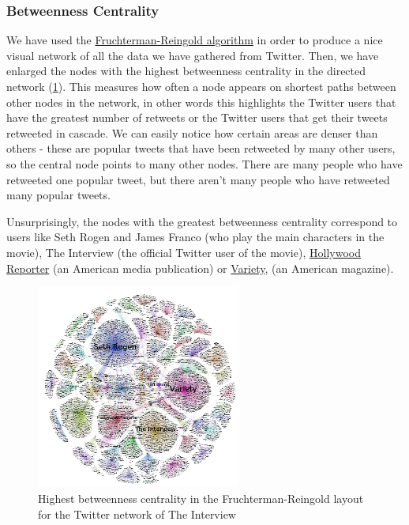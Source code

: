 \documentclass{llncs}
\begin{document}
\subsubsection{Betweenness Centrality}
We have used the
\href{https://github.com/gephi/gephi/wiki/Fruchterman-Reingold}{Fruchterman-Reingold
algorithm} in order to produce a nice visual network of all the data we have
gathered from Twitter. Then, we have enlarged the nodes with the highest
betweenness centrality in the directed network
(\ref{fig:interview-twitter-betweennes-centrality}). This measures how often a
node appears on shortest paths between other nodes in the network, in other
words this highlights the Twitter users that have the greatest number of
retweets or the Twitter users that get their tweets retweeted in cascade. We can
easily notice how certain areas are denser than others - these are popular
tweets that have been retweeted by many other users, so the central node points
to many other nodes. There are many people who have retweeted one popular tweet,
but there aren't many people who have retweeted many popular tweets.

Unsurprisingly, the nodes with the greatest betweenness centrality correspond to
users like Seth Rogen and James Franco (who play the main characters in the
movie), The Interview (the official Twitter user of the movie),
\href{http://www.hollywoodreporter.com/}{Hollywood Reporter} (an American media
publication) or \href{www.variety.com}{Variety}, (an American magazine).
%
\begin{figure}
\centering
\includegraphics[width=0.6\textwidth]{interview-twitter-betweennes-centrality.png}
\caption{Highest betweenness centrality in the Fruchterman-Reingold layout for
the Twitter network of The Interview
\label{fig:interview-twitter-betweennes-centrality}}
\end{figure}
%
\end{document}
